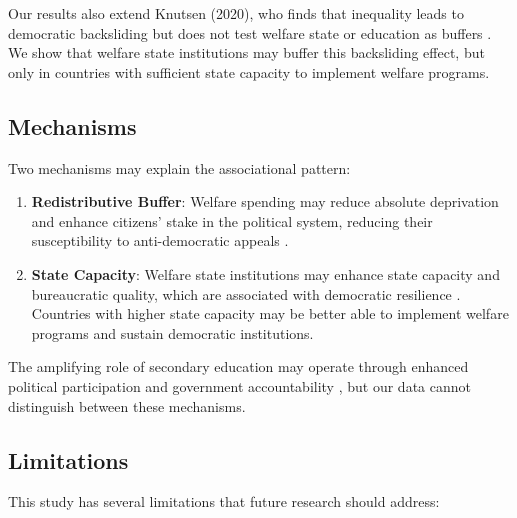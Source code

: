 \documentclass[11pt,letterpaper]{article}
\begin{document}
Our results also extend Knutsen (2020), who finds that inequality leads to democratic backsliding but does not test welfare state or education as buffers \cite{Knutsen2020}. We show that welfare state institutions may buffer this backsliding effect, but only in countries with sufficient state capacity to implement welfare programs.

\subsection{Mechanisms}

Two mechanisms may explain the associational pattern:

\begin{enumerate}
  \item \textbf{Redistributive Buffer}: Welfare spending may reduce absolute deprivation and enhance citizens' stake in the political system, reducing their susceptibility to anti-democratic appeals \cite{Huber2019}.

  \item \textbf{State Capacity}: Welfare state institutions may enhance state capacity and bureaucratic quality, which are associated with democratic resilience \cite{Coppedge2024}. Countries with higher state capacity may be better able to implement welfare programs and sustain democratic institutions.
\end{enumerate}

The amplifying role of secondary education may operate through enhanced political participation and government accountability \cite{Huber2019}, but our data cannot distinguish between these mechanisms.

\subsection{Limitations}

This study has several limitations that future research should address:
\end{document}
